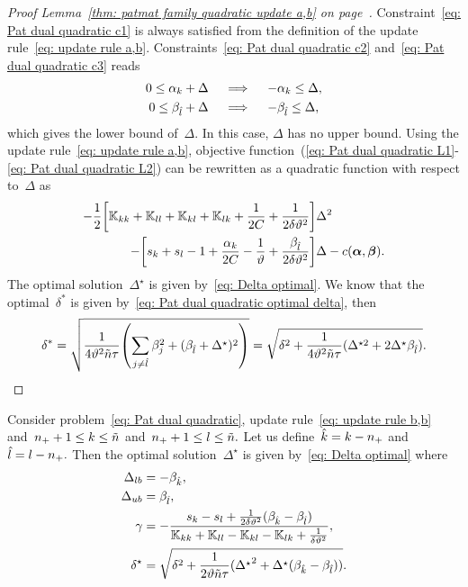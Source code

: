 \begin{proof}[Proof Lemma~\ref{thm: patmat family quadratic update a,b} on page~\pageref{thm: patmat family quadratic update a,b}]
  Constraint~\eqref{eq: Pat dual quadratic c1} is always satisfied from the definition of the update rule~\eqref{eq: update rule a,b}. Constraints~\eqref{eq: Pat dual quadratic c2} and~\eqref{eq: Pat dual quadratic c3} reads
  \begin{align*}
    0 \leq \alpha_k + \Delta
    & \quad \implies \quad
    - \alpha_k \leq \Delta, \\
    0 \leq \beta_{\hat{l}} + \Delta
    & \quad \implies \quad
    - \beta_{\hat{l}} \leq \Delta, \\
  \end{align*}
  which gives the lower bound of~$\Delta.$ In this case, $\Delta$ has no upper bound. Using the update rule~\eqref{eq: update rule a,b}, objective function~(\ref{eq: Pat dual quadratic L1}-\ref{eq: Pat dual quadratic L2}) can be rewritten as a quadratic function with respect to~$\Delta$ as
  \begin{align*}
    - \frac{1}{2} \Brac[s]{\K_{kk} + \K_{ll} + \K_{kl} + \K_{lk} + \frac{1}{2C} + \frac{1}{2 \delta \vartheta^2}} & \Delta^2 \\
    - \Brac[s]{s_k + s_l - 1 + \frac{\alphak}{2C} - \frac{1}{\vartheta} + \frac{\betal}{2\delta\vartheta^2}} & \Delta
    - c(\bm{\alpha}, \bm{\beta}).
  \end{align*}
  The optimal solution~$\Delta^{\star}$ is given by~\eqref{eq: Delta optimal}. We know that the optimal~$\delta^*$ is given by~\eqref{eq: Pat dual quadratic optimal delta}, then
  \begin{equation*}
    \delta^*
      = \sqrt{\frac{1}{4\vartheta^2 \ntil \tau} \Brac{\sum_{j\neq \hat{l}} \beta_j^2 + (\betal + \Delta^\star)^2}}
      = \sqrt{\delta^2 + \frac{1}{4\vartheta^2 \ntil \tau} (\Delta^{\star2} + 2\Delta^\star \betal)}.
  \end{equation*}
\end{proof}

\begin{lemma}\label{thm: patmat family quadratic update b,b}
  Consider problem~\eqref{eq: Pat dual quadratic}, update rule~\eqref{eq: update rule b,b} and~$n_{+} + 1 \leq k \leq \tilde{n}$ and~$n_{+} + 1 \leq l \leq \tilde{n}.$ Let us define~$\hat{k} = k - n_{+}$ and~$\hat{l} = l - n_{+}.$ Then the optimal solution~$\Delta^{\star}$ is given by~\eqref{eq: Delta optimal} where
  \begin{align*}
    \Delta_{lb} & = - \beta_{\hat{k}}, \\
    \Delta_{ub} & = \beta_{\hat{l}}, \\
    \gamma      & = -\frac{s_k - s_l + \frac{1}{2\delta \vartheta^2}(\beta_{\hat{k}} - \beta_{\hat{l}})}{\mathbb{K}_{kk} + \mathbb{K}_{ll} - \mathbb{K}_{kl} - \mathbb{K}_{lk} + \frac{1}{\delta \vartheta^2}}, \\
    \delta^{\star}  & = \sqrt{\delta^2 + \frac{1}{2 \vartheta \tilde{n} \tau}({\Delta^{\star}}^2 + \Delta^{\star} (\beta_{\hat{k}} - \beta_{\hat{l}}))}.
  \end{align*}
\end{lemma}

